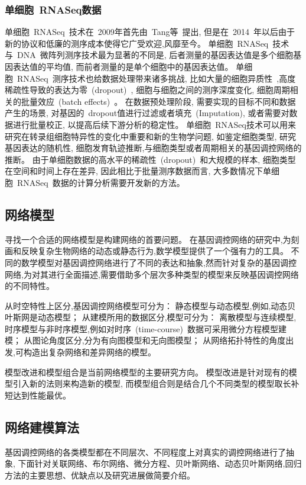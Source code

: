 \subsubsection{单细胞~RNASeq数据}
单细胞~RNASeq~技术在~2009年首先由~Tang等~\cite{tang2009mrna}提出,
但是在~2014~年以后由于新的协议和低廉的测序成本使得它广受欢迎,风靡至今。
单细胞~RNASeq~技术与~DNA~微阵列测序技术最为显著的不同是,
后者测量的基因表达值是多个细胞基因表达值的平均值,
而前者测量的是单个细胞中的基因表达值。
单细胞~RNASeq~测序技术也给数据处理带来诸多挑战,
比如大量的细胞异质性~\cite{wagner2016revealing},高度稀疏性导致的表达为零~(dropout)~\cite{kharchenko2014bayesian}, 细胞与细胞之间的测序深度变化, 细胞周期相关的批量效应~(batch effects)~\cite{buettner2015computational}。
在数据预处理阶段, 需要实现的目标不同和数据产生的场景, 对基因的~dropout值进行过滤或者填充~(Imputation), 或者需要对数据进行批量校正, 以提高后续下游分析的稳定性。
单细胞~RNASeq技术可以用来研究在转录组细胞特异性的变化中重要和新的生物学问题,
如鉴定细胞类型, 研究基因表达的随机性, 细胞发育轨迹推断,与细胞类型或者周期相关的基因调控网络的推断。
由于单细胞数据的高水平的稀疏性~(dropout)~和大规模的样本, 细胞类型在空间和时间上存在差异, 
因此相比于批量测序数据而言, 大多数情况下单细胞~RNASeq~数据的计算分析需要开发新的方法。

\subsection{网络模型}
寻找一个合适的网络模型是构建网络的首要问题。
在基因调控网络的研究中,为刻画和反映复杂生物网络的动态或静态行为,数学模型提供了一个强有力的工具。
不同的数学模型对基因调控网络进行了不同的表达和抽象,然而针对复杂的基因调控网络,为对其进行全面描述,需要借助多个层次多种类型的模型来反映基因调控网络的不同特性。

从时空特性上区分,基因调控网络模型可分为：
静态模型与动态模型,例如,动态贝叶斯网是动态模型；
从建模所用的数据区分,模型可分为：
离散模型与连续模型,时序模型与非时序模型,例如对时序~(time-course)~数据可采用微分方程模型建模；
从图论角度区分,分为有向图模型和无向图模型；
从网络拓扑特性的角度出发,可构造出复杂网络和差异网络的模型。

模型改进和模型组合是当前网络模型的主要研究方向。
模型改进是针对现有的模型引入新的法则来构造新的模型,
而模型组合则是结合几个不同类型的模型取长补短达到性能最优。

\subsection{网络建模算法}
基因调控网络的各类模型都在不同层次、不同程度上对真实的调控网络进行了抽象,
下面针对关联网络、布尔网络、微分方程、贝叶斯网络、动态贝叶斯网络,回归方法的主要思想、优缺点以及研究进展做简要介绍。

